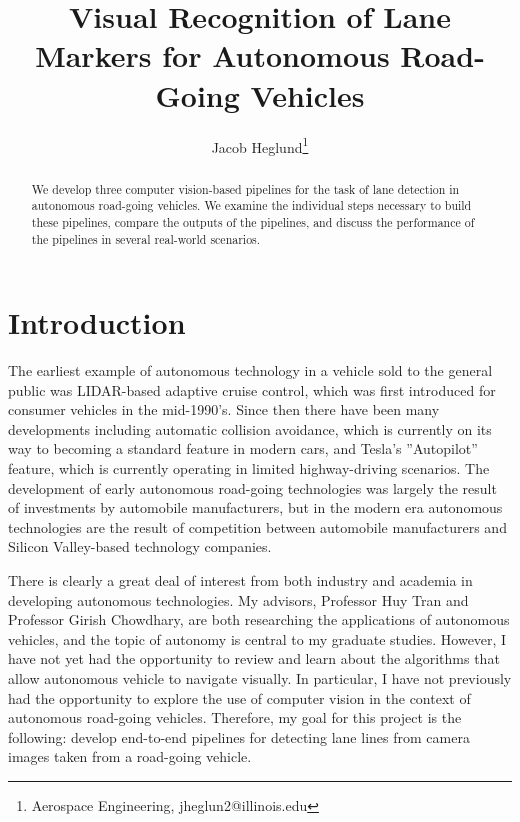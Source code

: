 \documentclass[conf]{new-aiaa}
\title{Visual Recognition of Lane Markers for Autonomous Road-Going Vehicles}
\author{Jacob Heglund\footnote{Aerospace Engineering, jheglun2@illinois.edu}}
\affil{University of Illinois Urbana-Champaign, Urbana, IL, 61801}
\begin{document}
\maketitle

\begin{abstract}
We develop three computer vision-based pipelines for the task of lane detection in autonomous road-going vehicles.  We examine the individual steps necessary to build these pipelines, compare the outputs of the pipelines, and discuss the performance of the pipelines in several real-world scenarios.

\end{abstract}

\section{Introduction}
\label{section: introduction}
The earliest example of autonomous technology in a vehicle sold to the general public was LIDAR-based adaptive cruise control, which was first introduced for consumer vehicles in the mid-1990’s.  Since then there have been many developments including automatic collision avoidance, which is currently on its way to becoming a standard feature in modern cars, and Tesla’s ”Autopilot” feature, which is currently operating in limited highway-driving scenarios. The development of early autonomous road-going technologies was largely the result of investments by automobile manufacturers, but in the modern era autonomous technologies are the result of competition between automobile manufacturers and Silicon Valley-based technology companies.

There is clearly a great deal of interest from both industry and academia in developing autonomous technologies. My advisors, Professor Huy Tran and Professor Girish Chowdhary, are both researching the applications of autonomous vehicles, and the topic of autonomy is central to my graduate studies.  However, I have not yet had the opportunity to review and learn about the algorithms that allow autonomous vehicle to navigate visually.  In particular, I have not previously had the opportunity to explore the use of computer vision in the context of autonomous road-going vehicles. Therefore, my goal for this project is the following: develop end-to-end pipelines for detecting lane lines from camera images taken from a road-going vehicle.
\end{document}

